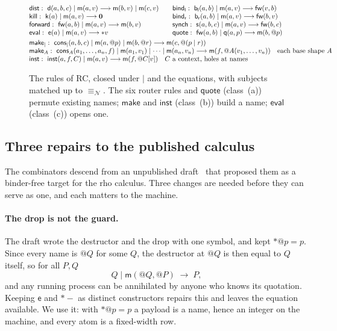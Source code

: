\documentclass[acmsmall,screen,review,anonymous]{acmart}
\makeatletter
\newcommand{\quo}[1]{@#1}
\newcommand{\drp}[1]{{*}#1}
\newcommand{\nil}{\mathbf{0}}
\newcommand{\nameq}{\equiv_{\mathcal{N}}}
\newcommand{\red}{\longrightarrow}
\newcommand{\mm}{\mathsf{m}}
\newcommand{\dd}{\mathsf{d}}
\newcommand{\kk}{\mathsf{k}}
\newcommand{\fw}{\mathsf{fw}}
\newcommand{\bl}{\mathsf{b}_{\mathsf{l}}}
\newcommand{\br}{\mathsf{b}_{\mathsf{r}}}
\newcommand{\sy}{\mathsf{s}}
\newcommand{\ev}{\mathsf{e}}
\newcommand{\qq}{\mathsf{q}}
\newcommand{\cons}{\mathsf{cons}}
\newcommand{\inst}{\mathsf{inst}}
\newcommand{\rc}{\textsc{RC}}
\makeatother
\begin{document}
\begin{figure}[t]
\small
\[
\begin{array}{@{}l@{\qquad}l@{}}
 \mathsf{dist}:\ \dd(a,b,c) \mid \mm(a,v) \red \mm(b,v) \mid \mm(c,v)
   & \mathsf{bind_l}:\ \bl(a,b) \mid \mm(a,v) \red \fw(v,b)\\
 \mathsf{kill}:\ \kk(a) \mid \mm(a,v) \red \nil
   & \mathsf{bind_r}:\ \br(a,b) \mid \mm(a,v) \red \fw(b,v)\\
 \mathsf{forward}:\ \fw(a,b) \mid \mm(a,v) \red \mm(b,v)
   & \mathsf{synch}:\ \sy(a,b,c) \mid \mm(a,v) \red \fw(b,c)\\
 \mathsf{eval}:\ \ev(a) \mid \mm(a,v) \red \drp{v}
   & \mathsf{quote}:\ \fw(a,b) \mid \qq(a,p) \red \mm(b,\quo{p})\\[3pt]
 \multicolumn{2}{@{}l@{}}{\mathsf{make}_{\mid}:\ \cons_{\mid}(a,b,c) \mid
   \mm(a,\quo{p}) \mid \mm(b,\quo{r}) \red \mm(c,\quo{(p \mid r)})}\\
 \multicolumn{2}{@{}l@{}}{\mathsf{make}_{A}:\ \cons_{A}(a_{1},\dots,a_{n},f)
   \mid \mm(a_{1},v_{1}) \mid \cdots \mid \mm(a_{n},v_{n})
   \red \mm(f,\quo{A(v_{1},\dots,v_{n})})
   \quad \text{each base shape } A}\\
 \multicolumn{2}{@{}l@{}}{\mathsf{inst}:\ \inst(a,f,C) \mid \mm(a,v) \red
   \mm(f,\quo{C[v]})
   \quad C \text{ a context, holes at names}}
\end{array}
\]
\caption{The rules of \rc{}, closed under $\mid$ and the equations, with
subjects matched up to $\nameq$. The six router rules and
$\mathsf{quote}$ (class~(a)) permute existing names; $\mathsf{make}$ and
$\mathsf{inst}$ (class~(b)) build a name; $\mathsf{eval}$ (class~(c)) opens
one.}
\label{fig:rules}
\end{figure}

\subsection{Three repairs to the published calculus}

The combinators descend from an unpublished draft~\cite{AnonOriginal} that
proposed them as a binder-free target for the rho calculus. Three changes
are needed before they can serve as one, and each matters to the machine.

\paragraph{The drop is not the guard.} The draft wrote the destructor and the
drop with one symbol, and kept $\drp{\quo{p}} = p$. Since every name is
$\quo{Q}$ for some $Q$, the destructor at $\quo{Q}$ is then equal to $Q$
itself, so for all $P,Q$
\[
  Q \mid \mm(\quo{Q},\quo{P}) \;\red\; P ,
\]
and any running process can be annihilated by anyone who knows its
quotation. Keeping $\ev$ and $\drp{-}$ as distinct constructors repairs this
and leaves the equation available. We use it: with $\drp{\quo{p}} = p$ a
payload is a name, hence an integer on the machine, and every atom is a
fixed-width row.
\end{document}
